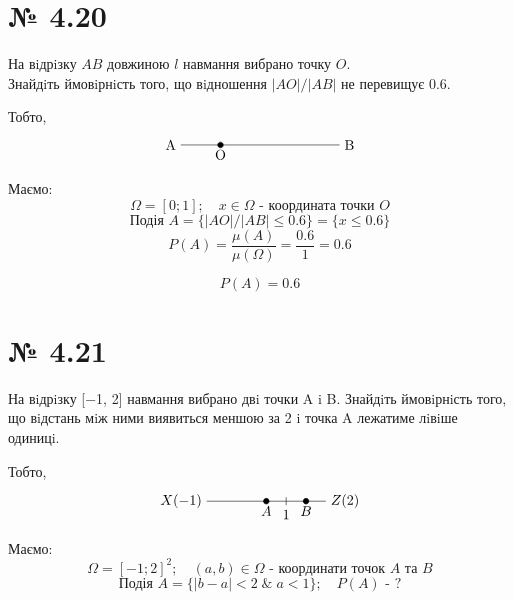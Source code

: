 
\section*{№ 4.20}
\begin{mdframed}
	На вiдрiзку $AB$ довжиною $l$ навмання вибрано точку $O$.\\ 
	Знайдiть ймовiрнiсть того, що вiдношення $|AO| / |AB|$ не перевищує $0.6$.
\end{mdframed}

Тобто,
$$
\begin{tikzpicture}
	\draw (0,0) node[anchor=east] {A}
		-- (4,0) node[anchor=west] {B};
	\filldraw[black] (1,0) circle (2pt) node[anchor=north] {O};
\end{tikzpicture}
$$

Маємо:
$$ \Omega = [0;1];\quad x \in \Omega \text{ - координата точки } O $$
$$ \text{Подія } A = \{ |AO| / |AB| \le 0.6\} = 
\{ x \le 0.6 \} $$
$$ P(A) = \frac{\mu(A)}{\mu(\Omega)} = \frac{0.6}{1} = 0.6 $$

\begin{mdframed}[style=ans]
	$$ P(A) = 0.6 $$
\end{mdframed}


\section*{№ 4.21}
\begin{mdframed}
	На вiдрiзку [−1, 2] навмання вибрано двi точки A i B. Знайдiть ймовiрнiсть
того, що вiдстань мiж ними виявиться меншою за 2 i точка A лежатиме лiвiше
одиницi.
\end{mdframed}

Тобто,
$$
\begin{tikzpicture}
	\draw (-1,0) node[anchor=east] {$X(-1)$}
		-- (2,0) node[anchor=west] {$Z(2)$};
	\filldraw[black] (0.5,0) circle (2pt) node[anchor=north] {$A$};
	\filldraw[black] (1.5,0) circle (2pt) node[anchor=north] {$B$};
	\draw (1,0.1) -- (1,-0.1) node[anchor=north] {$1$};
\end{tikzpicture}
$$

Маємо:
$$ \Omega = [-1;2]^2;\quad (a,b) \in \Omega \text{ - координати точок $A$ та $B$} $$
$$ \text{Подія } A = \{ |b-a| < 2 \;\&\; a<1 \};\quad P(A) \text{ - ?}$$


